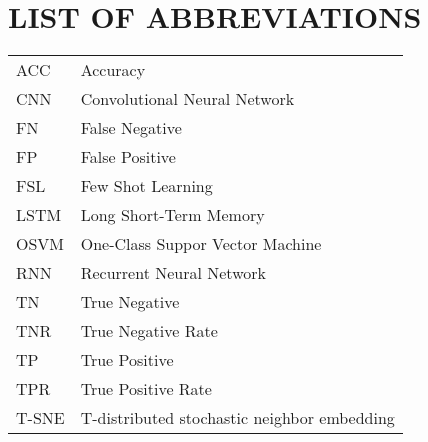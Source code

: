 \part{LIST OF ABBREVIATIONS}
\doublespacing

\begin{tabular}{p{}p{}}
ACC         &   Accuracy\\
CNN			&	Convolutional Neural Network \\
FN          &   False Negative\\
FP          &   False Positive\\
FSL         &   Few Shot Learning\\
LSTM        &   Long Short-Term Memory\\
OSVM        &   One-Class Suppor Vector Machine\\
RNN			&	Recurrent Neural Network\\
TN          &   True Negative\\
TNR         &   True Negative Rate\\
TP          &   True Positive\\
TPR         &   True Positive Rate\\
T-SNE       &   T-distributed stochastic neighbor embedding\\
\end{tabular}
